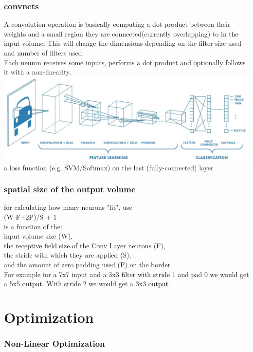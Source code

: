 \documentclass{beamer}
\begin{document}
\begin{frame}[allowframebreaks]\frametitle{convnets}
	A convolution operation is basically computing a dot product between their weights and a small region they are connected(currently overlapping) to in the input volume. This will change the dimensions depending on the filter size used and number of filters used.\\
	Each neuron receives some inputs, performs a dot product and optionally follows it with a non-linearity.\\
	\includegraphics[scale=0.4]{CNN/structure}\\
	a loss function (e.g. SVM/Softmax) on the last (fully-connected) layer\\
\end{frame}



\begin{frame}\frametitle{spatial size of the output volume}
	for calculating how many neurons "fit", use\\
	(W-F+2P)/S + 1\\
	is a function of the:\\
	input volume size (W),\\
	the receptive field size of the Conv Layer neurons (F), \\
	the stride with which they are applied (S), \\
	and the amount of zero padding used (P) on the border\\
	For example for a 7x7 input and a 3x3 filter with stride 1 and pad 0 we would get a 5x5 output. With stride 2 we would get a 3x3 output.

\end{frame}


\section{Optimization}

\begin{frame}\frametitle{Non-Linear Optimization}
	
\end{frame}
\end{document}
